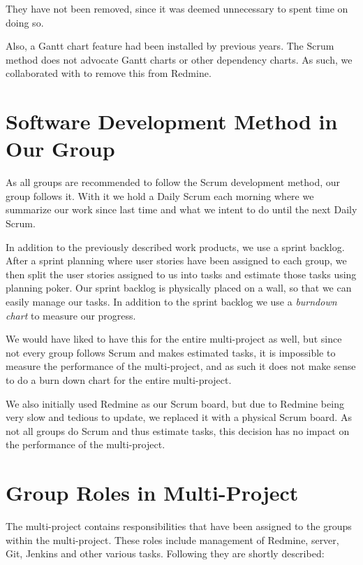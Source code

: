 They have not been removed, since it was deemed unnecessary to spent time on doing so.

Also, a Gantt chart feature had been installed by previous years. The Scrum method does not advocate Gantt charts or other dependency charts. As such, we collaborated with  to remove this from Redmine.

\section{Software Development Method in Our Group}\label{sec:swmethod_ourgroup}
As all groups are recommended to follow the Scrum development method, our group follows it. With it we hold a Daily Scrum each morning where we summarize our work since last time and what we intent to do until the next Daily Scrum.

In addition to the previously described work products, we use a sprint backlog. After a sprint planning where user stories have been assigned to each group, we then split the user stories assigned to us into tasks and estimate those tasks using planning poker. Our sprint backlog is physically placed on a wall, so that we can easily manage our tasks. In addition to the sprint backlog we use a \emph{burndown chart} to measure our progress.

We would have liked to have this for the entire multi-project as well, but since not every group follows Scrum and makes estimated tasks, it is impossible to measure the performance of the multi-project, and as such it does not make sense to do a burn down chart for the entire multi-project. 

We also initially used Redmine as our Scrum board, but due to Redmine being very slow and tedious to update, we replaced it with a physical Scrum board. As not all groups do Scrum and thus estimate tasks, this decision has no impact on the performance of the multi-project. 

\section{Group Roles in Multi-Project}\label{sec:multi_project_group_roles}

The multi-project contains responsibilities that have been assigned to the groups within the multi-project. These roles include management of Redmine, server, Git, Jenkins and other various tasks. Following they are shortly described:

